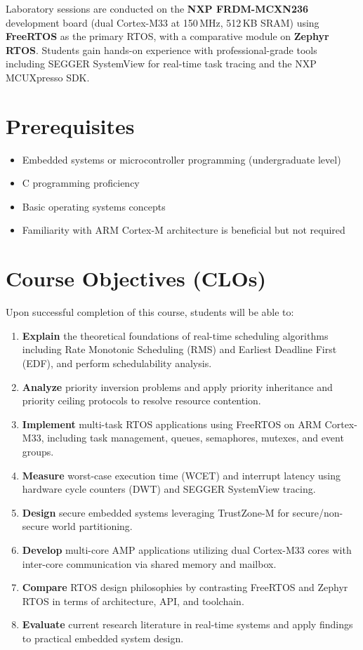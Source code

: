 \documentclass[12pt, a4paper]{article}
\begin{document}
Laboratory sessions are conducted on the \textbf{NXP FRDM-MCXN236} development board
(dual Cortex-M33 at 150\,MHz, 512\,KB SRAM) using \textbf{FreeRTOS} as the primary
RTOS, with a comparative module on \textbf{Zephyr RTOS}. Students gain hands-on
experience with professional-grade tools including SEGGER SystemView for real-time task
tracing and the NXP MCUXpresso SDK.

\section{Prerequisites}

\begin{itemize}[noitemsep]
  \item Embedded systems or microcontroller programming (undergraduate level)
  \item C programming proficiency
  \item Basic operating systems concepts
  \item Familiarity with ARM Cortex-M architecture is beneficial but not required
\end{itemize}

\section{Course Objectives (CLOs)}

Upon successful completion of this course, students will be able to:

\begin{enumerate}[label=\textbf{CLO\arabic*.}, leftmargin=*, noitemsep]
  \item \textbf{Explain} the theoretical foundations of real-time scheduling algorithms
        including Rate Monotonic Scheduling (RMS) and Earliest Deadline First (EDF),
        and perform schedulability analysis.
  \item \textbf{Analyze} priority inversion problems and apply priority inheritance and
        priority ceiling protocols to resolve resource contention.
  \item \textbf{Implement} multi-task RTOS applications using FreeRTOS on ARM Cortex-M33,
        including task management, queues, semaphores, mutexes, and event groups.
  \item \textbf{Measure} worst-case execution time (WCET) and interrupt latency using
        hardware cycle counters (DWT) and SEGGER SystemView tracing.
  \item \textbf{Design} secure embedded systems leveraging TrustZone-M for
        secure/non-secure world partitioning.
  \item \textbf{Develop} multi-core AMP applications utilizing dual Cortex-M33 cores
        with inter-core communication via shared memory and mailbox.
  \item \textbf{Compare} RTOS design philosophies by contrasting FreeRTOS and Zephyr
        RTOS in terms of architecture, API, and toolchain.
  \item \textbf{Evaluate} current research literature in real-time systems and apply
        findings to practical embedded system design.
\end{enumerate}
\end{document}
